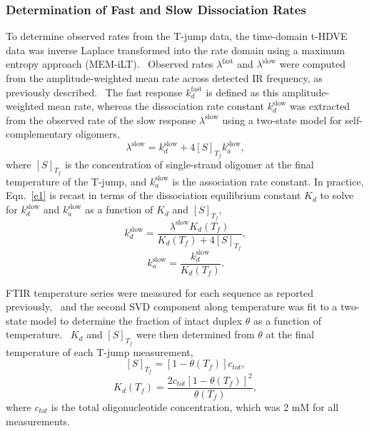 \documentclass[journal=jpcbfk,manuscript=article]{achemso}
\newcommand*{\rood}[1]{{#1}}
\begin{document}
\subsubsection{Determination of Fast and Slow Dissociation Rates}\label{sec:TjumpAnalysis}

To determine observed rates from the T-jump data, the time-domain t-HDVE data was inverse Laplace transformed into the rate domain using a maximum entropy approach (MEM-iLT).~\citep{Kumar2001OnTimescales} Observed rates $\lambda^\mathrm{fast}$ and $\lambda^\mathrm{slow}$ were computed from the amplitude-weighted mean rate across detected IR frequency, as previously described.~\citep{Sanstead2018DirectDehybridization} The fast response $k_d^\mathrm{fast}$ is defined as this amplitude-weighted mean rate, whereas the dissociation rate constant $k_d^\mathrm{slow}$ was extracted from the observed rate of the slow response $\lambda^\mathrm{slow}$ using a two-state model for self-complementary oligomers,~\citep{Bernasconi2012RelaxationKinetics}
	\begin{equation}\label{e1}
	\lambda^\mathrm{slow} = k_d^\mathrm{slow} + 4[S]_{T_f}k_a^\mathrm{slow},
	\end{equation}
where $[S]_{T_f}$ is the concentration of single-strand oligomer at the final temperature of the T-jump, and $k_a^\mathrm{slow}$ is the association rate constant. In practice, Eqn.~\ref{e1} is recast in terms of the dissociation equilibrium constant $K_d$ to solve for $k_d^\mathrm{slow}$ and $k_a^\mathrm{slow}$ as a function of $K_d$ and $[S]_{T_f}$,
	\begin{equation}\label{e2a}
	k_d^\mathrm{slow} = \frac{\lambda^\mathrm{slow}K_d(T_f)}{K_d(T_f)+4[S]_{T_f}},
	\end{equation}
	\begin{equation}\label{e2b}
	k_a^\mathrm{slow} = \frac{k_d^\mathrm{slow}}{K_d(T_f)}.
	\end{equation}

FTIR temperature series were measured for each sequence as reported previously,~\citep{Sanstead2016} and the second SVD component along temperature was fit to a \rood{two-state model} to determine the fraction of intact duplex $\theta$ as a function of temperature.~\citep{Marky1987CalculatingCurves} $K_d$ and $[S]_{T_f}$ were then determined from $\theta$ at the final temperature of each T-jump measurement,
	\begin{equation}\label{e3a}
	[S]_{T_f} = [1 - \theta(T_f)]c_{tot},
	\end{equation}
	\begin{equation}\label{e3b}
	K_d(T_f) = \frac{2c_{tot}[1 - \theta(T_f)]^2}{\theta(T_f)},
	\end{equation}
where $c_{tot}$ is the total oligonucleotide concentration, which was 2 mM for all measurements.
\end{document}
